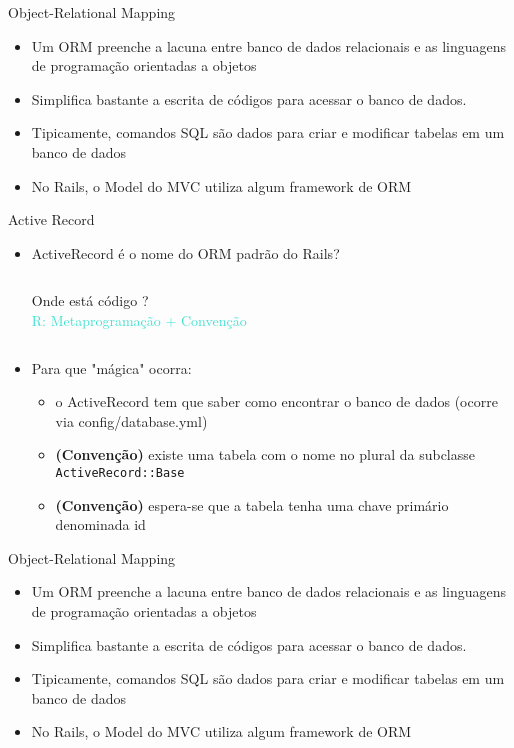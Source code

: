 \begin{frame}{Object-Relational Mapping}
	\begin{itemize}
		\item Um ORM \alert{preenche a lacuna} entre banco de dados relacionais e as linguagens de programação
			orientadas a objetos
			\item \alert{Simplifica} bastante a escrita de códigos para acessar o banco de dados.
		\item Tipicamente, comandos SQL são dados para criar e modificar tabelas em um
		banco de dados
		\item No Rails, o Model do MVC utiliza algum framework de ORM
	\end{itemize}	
\end{frame}

\begin{frame}{Active Record}
	\begin{itemize}
		\item ActiveRecord é o nome do \alert{ORM padrão} do Rails?
		\vspace{15pt}
		\begin{columns}[t]
			
			\alert{\Large Onde está código ?}
			\\
			\textcolor{Turquoise}{\Large R: Metaprogramação + Convenção}
		\end{columns}
		
		\item Para que \alert{"mágica"} ocorra:
		\begin{itemize}
			\item o ActiveRecord tem que saber como encontrar o banco de dados (ocorre via \alert{config/database.yml})
			\item \textbf{(Convenção)} existe uma \alert{tabela} com o \alert{nome no plural} da subclasse \verb|ActiveRecord::Base|
			\item \textbf{(Convenção)} espera-se que a tabela tenha uma chave primário denominada \alert{id}
		\end{itemize}
	\end{itemize}
\end{frame}

\begin{frame}{Object-Relational Mapping}
	\begin{itemize}
		\item Um ORM \alert{preenche a lacuna} entre banco de dados relacionais e as linguagens de programação
		orientadas a objetos
		\item \alert{Simplifica} bastante a escrita de códigos para acessar o banco de dados.
		\item Tipicamente, comandos SQL são dados para criar e modificar tabelas em um
		banco de dados
		\item No Rails, o Model do MVC utiliza algum framework de ORM
	\end{itemize}	
\end{frame}

